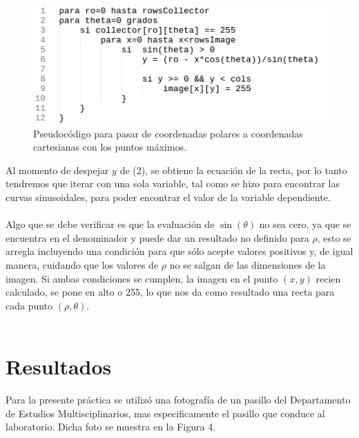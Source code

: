 \documentclass[conference]{IEEEtran}
\begin{document}
\begin{figure}[h]
	\setlength{\unitlength}{0.105in}
	\includegraphics[scale=0.50]{./images/pseudo3.png}
	\caption{ Pseudoc\'odigo para pasar de coordenadas polares a coordenadas cartesianas con los puntos m\'aximos. }
\end{figure}

Al momento de despejar $y$ de (2), se obtiene la ecuaci\'on de la recta, por lo tanto tendremos que iterar con una sola variable, tal como se hizo para encontrar las curvas sinusoidales, para poder encontrar el valor de la variable dependiente.\\\\ Algo que se debe verificar es que la evaluaci\'on de $\sin(\theta)$ no sea cero, ya que se encuentra en el denominador y puede dar un resultado no definido para $\rho$, esto se arregla incluyendo una condici\'on para que s\'olo acepte valores positivos y, de igual manera, cuidando que los valores de $\rho$ no se salgan de las dimensiones de la imagen. Si ambas condiciones se cumplen, la imagen en el punto $(x,y)$ recien calculado, se pone en alto o 255, lo que nos da como resultado una recta para cada punto $(\rho,\theta)$.\\\\

\section{Resultados}
Para la presente pr\'actica se utiliz\'o una fotograf\'ia de un pasillo del Departamento de Estudios Multisciplinarios, mas especificamente el pasillo que conduce al laboratorio. Dicha foto se muestra en la Figura 4.
\end{document}
